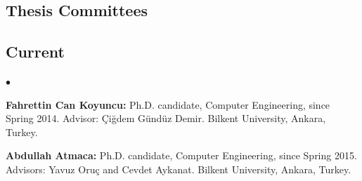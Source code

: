 \documentclass[margin,line]{res}
\newenvironment{list2}{
  \begin{list}{$\bullet$}{%
      \setlength{\itemsep}{0in}
      \setlength{\parsep}{0in} \setlength{\parskip}{0in}
      \setlength{\topsep}{0in} \setlength{\partopsep}{0in} 
      \setlength{\leftmargin}{0.2in}}}{\end{list}}
\begin{document}
\begin{resume}
\section{\sc Thesis Committees}
\vspace*{-.4cm}
\subsection{\small \sc Current}
\begin{list2}
\item
  {\bf Fahrettin Can Koyuncu:} Ph.D. candidate, Computer Engineering, since Spring 2014.
  Advisor: Çiğdem Gündüz Demir.
  Bilkent University, Ankara, Turkey.
\item
  {\bf Abdullah Atmaca:} Ph.D. candidate, Computer Engineering, since Spring 2015.
  Advisors: Yavuz Oruç and Cevdet Aykanat.
  Bilkent University, Ankara, Turkey.
\end{list2}

\vspace*{-.4cm}

\end{resume}
\end{document}
